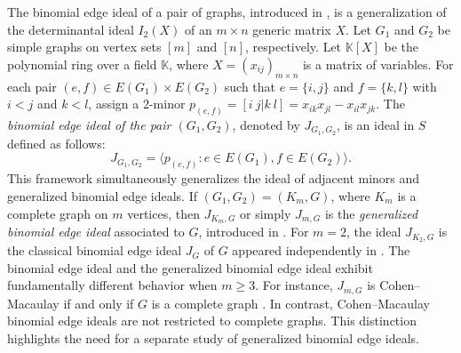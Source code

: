\documentclass[12pt,reqno]{amsart}
\newcommand \K{\mathbb{K}}
\theoremstyle{plain}
\theoremstyle{definition}
\begin{document}
The binomial edge ideal of a pair of graphs, introduced in \cite{The-binomial-edge-ideal-of-pair-of-graphs-Ene-Herzog-Hibi-Qureshi}, is a generalization of the determinantal ideal $I_2(X)$ of an $m\times n$ generic matrix $X$. Let $G_1$ and $G_2$ be simple graphs on vertex sets $[m]$ and $[n]$, respectively. Let $\K[X]$ be  the polynomial ring over a field $\K$, where $X=(x_{ij})_{m\times n}$ is a matrix of variables. For each pair $(e,f)\in E(G_1)\times E(G_2)$ such that $e=\{i,j\}$ and $f=\{k,l\}$ with $i<j$ and $k<l$, assign a $2$-minor $p_{(e,f)}=[i~j|k~l]=x_{ik}x_{jl}-x_{il}x_{jk}$. The \emph{binomial edge ideal of the pair $(G_1,G_2)$}, denoted by $J_{G_1,G_2}$, is an ideal in $S$ defined as follows:
$$J_{G_1,G_2}=\langle p_{(e,f)}:e\in E(G_1),f\in E(G_2)\rangle.$$
This framework simultaneously generalizes the ideal of adjacent minors and generalized binomial edge ideals. If $(G_1,G_2)=(K_m,G)$, where $K_m$ is a complete graph on $m$ vertices, then $J_{K_m,G}$ or simply $J_{m,G}$ is the \emph{generalized binomial edge ideal} associated to $G$, introduced in \cite{GBI-Rauh-2013}. For $m=2$, the ideal $J_{K_2,G}$ is the classical binomial edge ideal $J_G$ of $G$ appeared independently in \cite{BEIandConditionalDependance,GraphsandIdealsGeneratedbysome2-minor-Ohtani-Masahiro}. The binomial edge ideal and the generalized binomial edge ideal exhibit fundamentally different behavior when \(m\geq 3\). For instance, \(J_{m,G}\) is Cohen--Macaulay if and only if \(G\) is a complete graph \cite{CM-GBEI-Amata-Crupi-Rinaldo}. In contrast, Cohen--Macaulay binomial edge ideals are not restricted to complete graphs. This distinction highlights the need for a separate study of generalized binomial edge ideals. 
\end{document}
